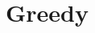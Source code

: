 \documentclass{beamer}
\begin{document}


% 
% 
% 
% 
% 
% 
% 
% 
% 
% 
% 

\section{Greedy}



\end{document}
